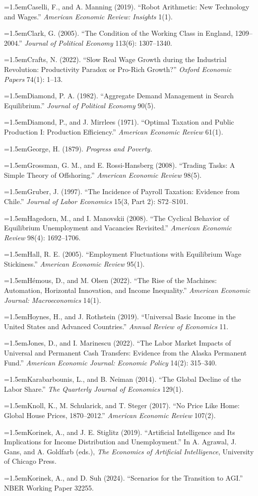 \documentclass[12pt]{article}
\theoremstyle{plain}
\newcommand{\refentry}[1]{\par\hangindent=1.5em\hangafter=1\noindent #1}
\begin{document}
{\refentry{Caselli, F., and A. Manning (2019). ``Robot Arithmetic: New Technology and Wages.'' \emph{American Economic Review: Insights} 1(1).}
\refentry{Clark, G. (2005). ``The Condition of the Working Class in England, 1209--2004.'' \emph{Journal of Political Economy} 113(6): 1307--1340.}
\refentry{Crafts, N. (2022). ``Slow Real Wage Growth during the Industrial Revolution: Productivity Paradox or Pro-Rich Growth?'' \emph{Oxford Economic Papers} 74(1): 1--13.}
\refentry{Diamond, P. A. (1982). ``Aggregate Demand Management in Search Equilibrium.'' \emph{Journal of Political Economy} 90(5).}
\refentry{Diamond, P., and J. Mirrlees (1971). ``Optimal Taxation and Public Production I: Production Efficiency.'' \emph{American Economic Review} 61(1).}
\refentry{George, H. (1879). \emph{Progress and Poverty.}}
\refentry{Grossman, G. M., and E. Rossi-Hansberg (2008). ``Trading Tasks: A Simple Theory of Offshoring.'' \emph{American Economic Review} 98(5).}
\refentry{Gruber, J. (1997). ``The Incidence of Payroll Taxation: Evidence from Chile.'' \emph{Journal of Labor Economics} 15(3, Part 2): S72--S101.}
\refentry{Hagedorn, M., and I. Manovskii (2008). ``The Cyclical Behavior of Equilibrium Unemployment and Vacancies Revisited.'' \emph{American Economic Review} 98(4): 1692--1706.}
\refentry{Hall, R. E. (2005). ``Employment Fluctuations with Equilibrium Wage Stickiness.'' \emph{American Economic Review} 95(1).}
\refentry{Hémous, D., and M. Olsen (2022). ``The Rise of the Machines: Automation, Horizontal Innovation, and Income Inequality.'' \emph{American Economic Journal: Macroeconomics} 14(1).}
\refentry{Hoynes, H., and J. Rothstein (2019). ``Universal Basic Income in the United States and Advanced Countries.'' \emph{Annual Review of Economics} 11.}
\refentry{Jones, D., and I. Marinescu (2022). ``The Labor Market Impacts of Universal and Permanent Cash Transfers: Evidence from the Alaska Permanent Fund.'' \emph{American Economic Journal: Economic Policy} 14(2): 315--340.}
\refentry{Karabarbounis, L., and B. Neiman (2014). ``The Global Decline of the Labor Share.'' \emph{The Quarterly Journal of Economics} 129(1).}
\refentry{Knoll, K., M. Schularick, and T. Steger (2017). ``No Price Like Home: Global House Prices, 1870--2012.'' \emph{American Economic Review} 107(2).}
\refentry{Korinek, A., and J. E. Stiglitz (2019). ``Artificial Intelligence and Its Implications for Income Distribution and Unemployment.'' In A. Agrawal, J. Gans, and A. Goldfarb (eds.), \emph{The Economics of Artificial Intelligence}, University of Chicago Press.}
\refentry{Korinek, A., and D. Suh (2024). ``Scenarios for the Transition to AGI.'' NBER Working Paper 32255.}
}
\end{document}
